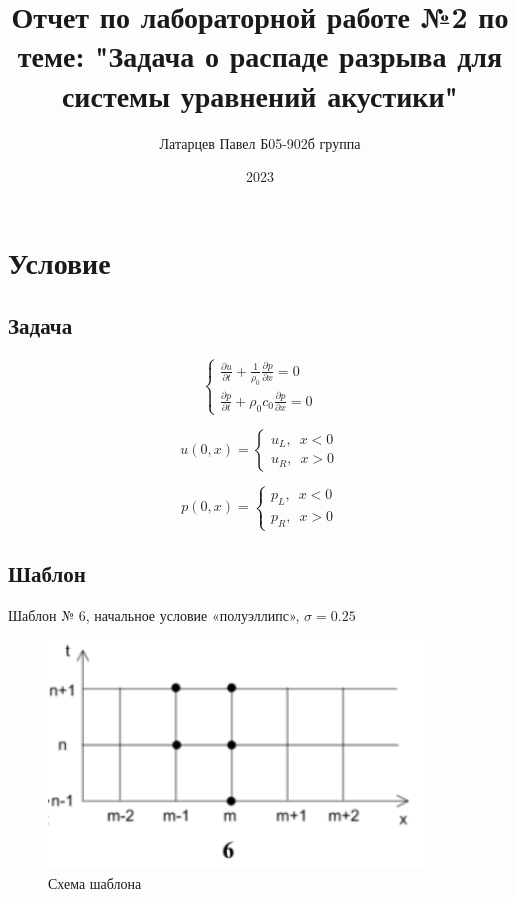 \documentclass[a4paper, 12pt]{article} %
\title{Отчет по лабораторной работе №2 по теме: "Задача о распаде разрыва для системы уравнений акустики"}
\author{Латарцев Павел Б05-902б группа}
\date{2023}
\begin{document}
\maketitle

\section{Условие} 

\subsection{Задача}

\begin{equation*}
 \begin{cases}
	\frac{\partial u}{\partial t} + \frac{1}{\rho_{0}}\frac{\partial p}{\partial x} = 0 \\
	\frac{\partial p}{\partial t} + \rho_{0} c_{0} \frac{\partial p}{\partial x} = 0
 \end{cases}
\end{equation*}

\begin{equation*}
u(0, x) =  
 \begin{cases}
	u_L, \,\,\, x < 0 \\
	u_R, \,\,\, x > 0
 \end{cases} 
\end{equation*}

\begin{equation*}
p(0, x) =  
 \begin{cases}
	p_L, \,\,\, x < 0 \\
	p_R, \,\,\, x > 0
 \end{cases}
\end{equation*}

\subsection{Шаблон}

Шаблон № 6, начальное условие «полуэллипс», $\sigma = 0.25$

\begin{figure}[h!]
    \centering
    \includegraphics[width=10cm]{shablon.png}
    \caption{Схема шаблона}
    \label{fig:vac}
\end{figure} 
\end{document}
